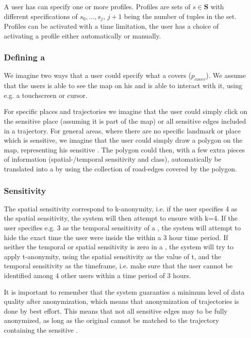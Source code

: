A user has can specify one or more profiles. Profiles are sets of $s \in \mathbf{S}$ with different specifications of $s_0, \ldots, s_{j}$, $j+1$ being the number of tuples in the set. Profiles can be activated with a time limitation, the user has a choice of activating a profile either automatically or manually.


\subsubsection{Defining a \poins}

We imagine two ways that a user could specify what a \poi covers ($p_{cover}$). We assume that the users is able to see the map on his \md and is able to interact with it, using e.g. a touchscreen or cursor.

For specific places and trajectories we imagine that the user could simply click on the sensitive place (assuming it is part of the map) or all sensitive edges included in a trajectory. For general areas, where there are no specific landmark or place which is sensitive, we imagine that the user could simply draw a polygon on the map, representing his sensitive \poins. The polygon could then, with a few extra pieces of information (spatial-/temporal sensitivity and class), automatically be translated into a \poi by using the collection of road-edges covered by the polygon.


\subsubsection{Sensitivity}

The spatial sensitivity correspond to k-anonymity, i.e. if the user specifies 4 as the spatial sensitivity, the system will then attempt to ensure \kanon with k=4. If the user specifies e.g. 3 as the temporal sensitivity of a \poins, the system will attempt to hide the exact time the user were inside the \poi within a 3 hour time period.
If neither the temporal or spatial sensitivity is zero in a \poins, the system will try to apply t-anonymity, using the spatial sensitivity as the value of t, and the temporal sensitivity as the timeframe, i.e. make sure that the user cannot be identified among 4 other users within a time period of 3 hours.

It is important to remember that the system guaranties a minimum level of data quality after anonymization, which means that anonymization of trajectories is done by best effort. This means that not all sensitive edges may to be fully anonymized, as long as the original cannot be matched to the trajectory containing the sensitive \poins.


